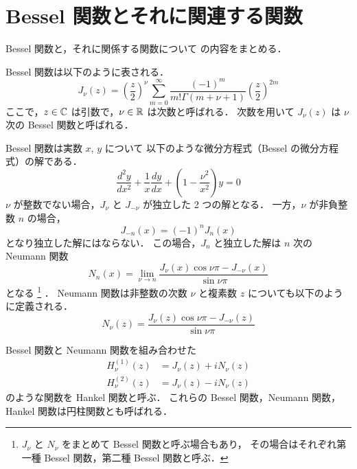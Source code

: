 %

\section{Bessel 関数とそれに関連する関数}\label{sec:special-function_bessel-function}

Bessel 関数と，それに関係する関数について
\cite{Kaneko1984, Hockstadt1974, Morse1953, Press2007}
の内容をまとめる．

Bessel 関数は以下のように表される．
\begin{equation}
    J_{\nu}(z) = \left(\frac{z}{2}\right)^{\nu}
    \sum_{m = 0}^{\infty} \frac{(-1)^m}{m! \Gamma(m + \nu + 1)}
    \left(\frac{z}{2}\right)^{2m}
    \label{eq:special-functions_bessel-function}
\end{equation}
ここで，$z \in \mathbb{C}$ は引数で，$\nu \in \mathbb{R}$ は次数と呼ばれる．
次数を用いて $J_{\nu}(z)$ は $\nu$ 次の Bessel 関数と呼ばれる．

Bessel 関数は実数 $x$, $y$ について
以下のような微分方程式（Bessel の微分方程式）の解である．
\begin{equation}
    \frac{d^2 y}{dx^2} + \frac{1}{x} \frac{dy}{dx} + \left(1 - \frac{\nu^2}{x^2}\right) y = 0
\end{equation}
$\nu$ が整数でない場合，$J_{\nu}$ と $J_{-\nu}$ が独立した 2 つの解となる．
一方，$\nu$ が非負整数 $n$ の場合，
\begin{equation}
    J_{-n}(x) = (-1)^{n} J_{n}(x)
\end{equation}
となり独立した解にはならない．
この場合，$J_{n}$ と独立した解は $n$ 次の Neumann 関数
\begin{equation}
    N_n(x) = \lim_{\nu \to n} \frac{J_{\nu}(x) \cos{\nu \pi} - J_{-\nu}(x)}{\sin{\nu \pi}}
\end{equation}
となる
\footnote{$J_{\nu}$ と $N_{\nu}$ をまとめて Bessel 関数と呼ぶ場合もあり，%
    その場合はそれぞれ第一種 Bessel 関数，第二種 Bessel 関数と呼ぶ．}
．
Neumann 関数は非整数の次数 $\nu$ と複素数 $z$ についても以下のように定義される．
\begin{equation}
    N_{\nu}(z) = \frac{J_{\nu}(z) \cos{\nu \pi} - J_{-\nu}(z)}{\sin{\nu \pi}}
\end{equation}


Bessel 関数と Neumann 関数を組み合わせた
\begin{align}
    H_{\nu}^{(1)}(z) & = J_{\nu}(z) + i N_{\nu}(z) \\
    H_{\nu}^{(2)}(z) & = J_{\nu}(z) - i N_{\nu}(z)
\end{align}
のような関数を Hankel 関数と呼ぶ．
これらの Bessel 関数，Neumann 関数，Hankel 関数は円柱関数とも呼ばれる．

